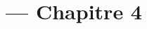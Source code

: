 
\title{\TSwiftTitle{} --- Chapitre 4}

\newcommand{\TSwiftRoot}[0]{../..} %



\maketitle

\tableofcontents




